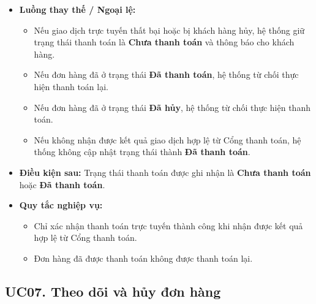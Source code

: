 \documentclass[12pt,a4paper]{article}
\begin{document}
\begin{itemize}
\item \textbf{Luồng thay thế / Ngoại lệ:}

\begin{itemize}

    \item Nếu giao dịch trực tuyến thất bại hoặc bị khách hàng hủy, hệ thống giữ trạng thái thanh toán là \textbf{Chưa thanh toán} và thông báo cho khách hàng.

    \item Nếu đơn hàng đã ở trạng thái \textbf{Đã thanh toán}, hệ thống từ chối thực hiện thanh toán lại.

    \item Nếu đơn hàng đã ở trạng thái \textbf{Đã hủy}, hệ thống từ chối thực hiện thanh toán.

    \item Nếu không nhận được kết quả giao dịch hợp lệ từ Cổng thanh toán, hệ thống không cập nhật trạng thái thành \textbf{Đã thanh toán}.

\end{itemize}

 \item \textbf{Điều kiện sau:} Trạng thái thanh toán được ghi nhận là \textbf{Chưa thanh toán} hoặc \textbf{Đã thanh toán}.

 \item \textbf{Quy tắc nghiệp vụ:}

 \begin{itemize}

  \item Chỉ xác nhận thanh toán trực tuyến thành công khi nhận được kết quả hợp lệ từ Cổng thanh toán.

  \item Đơn hàng đã được thanh toán không được thanh toán lại.

 \end{itemize}

\end{itemize}


\subsection{UC07. Theo dõi và hủy đơn hàng}
\end{document}
